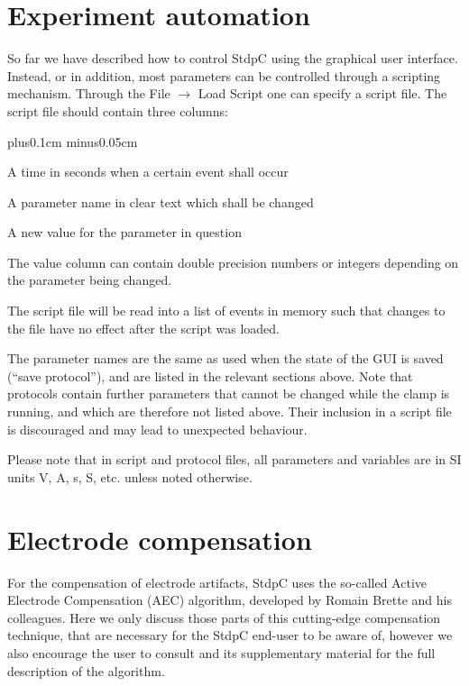 \documentclass{article}
\makeatletter
\newenvironment{myenum}{
\begin{list}{\labelenumi}{\setlength{\leftmargin}{1.3em}
  \setcounter{enumi}{0}
  \renewcommand{\item}{\addtocounter{enumi}{1}\unskip \vspace{-0.1cm}\@inmatherr\item
  \@ifnextchar [\@item{\@noitemargtrue \@item[\@itemlabel]} \unskip}}
  \itemsep0.1cm plus0.1cm minus0.05cm
  \listparindent0cm
  \setlength{\labelsep}{0.5em}
  \setlength{\labelwidth}{0.8em}}
{\end{list}}
\makeatother
\begin{document}
\section{Experiment automation} \label{scriptsect}

So far we have described how to control StdpC using the graphical
user interface. Instead, or in addition, most parameters can be
controlled through a scripting mechanism. Through the
File $\rightarrow$ Load Script one can specify a script file. The script
file should contain three columns:
\begin{myenum}
\item A time in seconds when a certain event shall occur
\item A parameter name in clear text which shall be changed
\item A new value for the parameter in question
\end{myenum}
The value column can contain double precision numbers or integers
depending on the parameter being changed.

The script file will be read into a list of events in memory such that
changes to the file have no effect after the script was loaded.

The parameter names are the same as used when the state of the GUI is
saved (``save protocol''), and are listed in the relevant sections above.
Note that protocols contain further parameters that cannot be changed
while the clamp is running, and which are therefore not listed above.
Their inclusion in a script file is discouraged and may lead
to unexpected behaviour.

Please note that in script and protocol files, all parameters and variables are in SI
units V, A, s, S, etc. unless noted otherwise.


\section{Electrode compensation} \label{eleccomp}

For the compensation of electrode artifacts, StdpC uses the so-called Active
Electrode Compensation (AEC) algorithm, developed by Romain Brette and his 
colleagues. Here we only discuss those parts of this cutting-edge
compensation technique, that are necessary for the StdpC end-user to be aware of,
however we also encourage the user to consult \cite{Brette2008} 
and its supplementary material for the full description of the algorithm.
\end{document}
